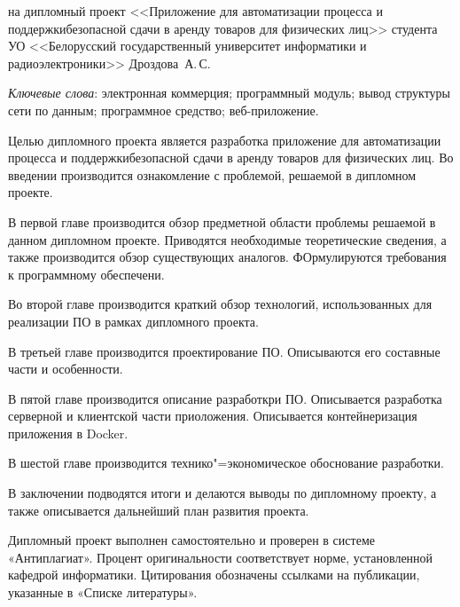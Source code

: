 \thispagestyle{empty}

\begin{center}
  \begin{minipage}{0.82\textwidth}
    на дипломный проект <<Приложение для автоматизации процесса и поддержкибезопасной сдачи в аренду товаров для физических лиц>> студента УО <<Белорусский государственный университет информатики и радиоэлектроники>> Дроздова~А.\,С.
  \end{minipage}
\end{center}

\emph{Ключевые слова}: электронная коммерция; программный модуль; вывод структуры сети по данным; программное средство; веб-приложение.

\vspace{4\parsep}


Целью дипломного проекта является разработка приложение для автоматизации процесса и поддержкибезопасной сдачи в аренду товаров для физических лиц.
Во введении производится ознакомление с проблемой, решаемой в дипломном проекте.

В первой главе производится обзор предметной области проблемы решаемой в данном дипломном проекте.
Приводятся необходимые теоретические сведения, а также производится обзор существующих аналогов.
ФОрмулируются требования к программному обеспечени.

Во второй главе производится краткий обзор технологий, использованных для реализации ПО в рамках дипломного проекта.

В третьей главе производится проектирование ПО.
Описываются его составные части и особенности.

В пятой главе производится описание разработкри ПО.
Описывается разработка серверной и клиентской части приоложения.
Описывается контейнеризация приложения в Docker.

В шестой главе производится технико"=экономическое обоснование разработки.

В заключении подводятся итоги и делаются выводы по дипломному проекту, а также описывается дальнейший план развития проекта.

Дипломный проект выполнен самостоятельно и проверен в системе «Антиплагиат».
Процент оригинальности соответствует норме, установленной кафедрой информатики.
Цитирования обозначены ссылками на публикации, указанные в «Списке литературы».


\clearpage

